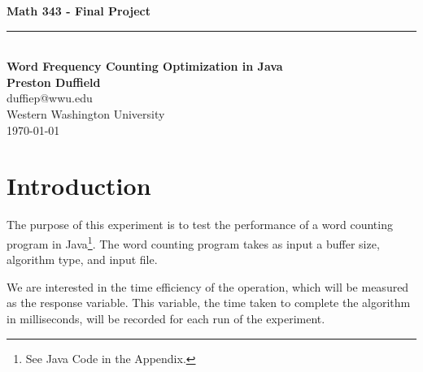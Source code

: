 \documentclass{article}
\begin{document}
\noindent

\begin{center}
    \vspace*{0.3\textheight}
    {\fontsize{80}{18}\textbf{Math 343 - Final Project}}\\
    \vspace{6pt} %
    \rule{0.87\linewidth}{1pt}\\ %
    \vspace{12pt} %
    \LARGE\textbf{Word Frequency Counting Optimization in Java}\\
    
    \vspace{12pt}
    \Large\textbf{Preston Duffield} \\
    \Large duffiep@wwu.edu \\
    \Large Western Washington University \\
    \today
    \vspace{24pt}
\end{center}

%
%
%
\clearpage
\section{Introduction}
  The purpose of this experiment is to test the performance of a
  word counting program in Java\footnote{See Java Code in the Appendix.}.
  The word counting program takes as input a buffer size, algorithm type, and input file.

  We are interested in the time efficiency of the operation, which will be measured as the
  response variable. This variable, the time taken to complete the algorithm
  in milliseconds, will be recorded for each run of the experiment.
\end{document}
